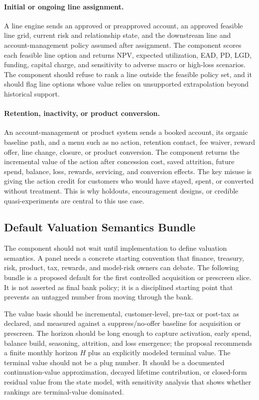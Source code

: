 \documentclass[11pt]{article}
\newcommand{\1}{\mathbf{1}}
\begin{document}
\paragraph{Initial or ongoing line assignment.}
A line engine sends an approved or preapproved account, an approved feasible
line grid, current risk and relationship state, and the downstream line and
account-management policy assumed after assignment. The component scores each
feasible line option and returns NPV, expected utilization, EAD, PD, LGD,
funding, capital charge, and sensitivity to adverse macro or high-loss
scenarios. The component should refuse to rank a line outside the feasible
policy set, and it should flag line options whose value relies on unsupported
extrapolation beyond historical support.

\paragraph{Retention, inactivity, or product conversion.}
An account-management or product system sends a booked account, its organic
baseline path, and a menu such as no action, retention contact, fee waiver,
reward offer, line change, closure, or product conversion. The component
returns the incremental value of the action after concession cost, saved
attrition, future spend, balance, loss, rewards, servicing, and conversion
effects. The key misuse is giving the action credit for customers who would
have stayed, spent, or converted without treatment. This is why holdouts,
encouragement designs, or credible quasi-experiments are central to this use
case.

\subsection{Default Valuation Semantics Bundle}
\label{sec:valuation-semantics-default}

The component should not wait until implementation to define valuation
semantics. A panel needs a concrete starting convention that finance, treasury,
risk, product, tax, rewards, and model-risk owners can debate. The following
bundle is a proposed default for the first controlled acquisition or prescreen
slice. It is not asserted as final bank policy; it is a disciplined starting
point that prevents an untagged number from moving through the bank.

The value basis should be incremental, customer-level, pre-tax or post-tax as
declared, and measured against a suppress/no-offer baseline for acquisition or
prescreen. The horizon should be long enough to capture activation, early
spend, balance build, seasoning, attrition, and loss emergence; the proposal
recommends a finite monthly horizon $H$ plus an explicitly modeled terminal
value. The terminal value should not be a plug number. It should be a
documented continuation-value approximation, decayed lifetime contribution, or
closed-form residual value from the state model, with sensitivity analysis that
shows whether rankings are terminal-value dominated.
\end{document}

